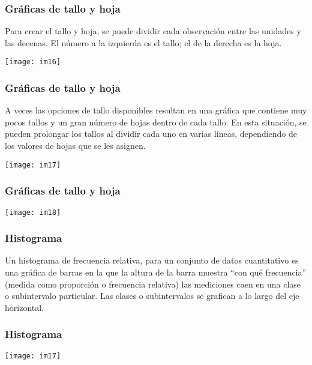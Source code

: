 \documentclass[spanish]{beamer}
\begin{document}
\begin{frame}
\frametitle{Gráficas de tallo y hoja}
Para crear el tallo y hoja, se puede dividir cada observación entre las unidades y las decenas. El número a la izquierda es el tallo; el de la derecha es la hoja.

\begin{center}
\texttt{[image: im16]}
\end{center}
\end{frame}
\begin{frame}
\frametitle{Gráficas de tallo y hoja}
A veces las opciones de tallo disponibles resultan en una gráfica que contiene muy pocos tallos y un gran número de hojas dentro de cada tallo. En esta situación, se pueden
prolongar los tallos al dividir cada uno en varias líneas, dependiendo de los valores de hojas que se les asignen.

\begin{center}
\texttt{[image: im17]}
\end{center}
\end{frame}
\begin{frame}
\frametitle{Gráficas de tallo y hoja}

\begin{center}
\texttt{[image: im18]}
\end{center}
\end{frame}
\begin{frame}
\frametitle{Histograma}
Un histograma de frecuencia relativa, para un conjunto de datos cuantitativo es una gráfica de barras en la que la altura de la barra muestra “con qué frecuencia” (medida como proporción o frecuencia relativa) las mediciones caen en una clase o subintervalo particular. Las clases o subintervalos se grafican a lo largo del eje horizontal.
\end{frame}
\begin{frame}
\frametitle{Histograma}
\begin{center}
\texttt{[image: im17]}
\end{center}
\end{frame}
\end{document}
